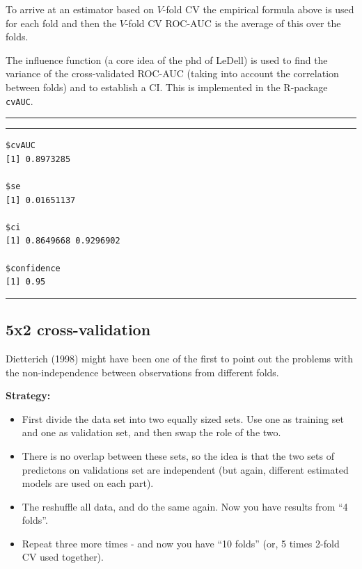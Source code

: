 \documentclass[
  letterpaper,
  DIV=11,
  numbers=noendperiod]{scrartcl}
\begin{document}
To arrive at an estimator based on \(V\)-fold CV the empirical formula
above is used for each fold and then the \(V\)-fold CV ROC-AUC is the
average of this over the folds.

The influence function (a core idea of the phd of LeDell) is used to
find the variance of the cross-validated ROC-AUC (taking into account
the correlation between folds) and to establish a CI. This is
implemented in the R-package \texttt{cvAUC}.

\begin{center}\rule{0.5\linewidth}{0.5pt}\end{center}

\footnotesize

\begin{center}\rule{0.5\linewidth}{0.5pt}\end{center}

\begin{verbatim}
$cvAUC
[1] 0.8973285

$se
[1] 0.01651137

$ci
[1] 0.8649668 0.9296902

$confidence
[1] 0.95
\end{verbatim}

\begin{center}\rule{0.5\linewidth}{0.5pt}\end{center}

\hypertarget{x2-cross-validation}{%
\subsection{5x2 cross-validation}\label{x2-cross-validation}}

Dietterich (1998) might have been one of the first to point out the
problems with the non-independence between observations from different
folds.

\textbf{Strategy:}

\begin{itemize}
\item
  First divide the data set into two equally sized sets. Use one as
  training set and one as validation set, and then swap the role of the
  two.
\item
  There is no overlap between these sets, so the idea is that the two
  sets of predictons on validations set are independent (but again,
  different estimated models are used on each part).
\item
  The reshuffle all data, and do the same again. Now you have results
  from ``4 folds''.
\item
  Repeat three more times - and now you have ``10 folds'' (or, 5 times
  2-fold CV used together).
\end{itemize}
\end{document}
